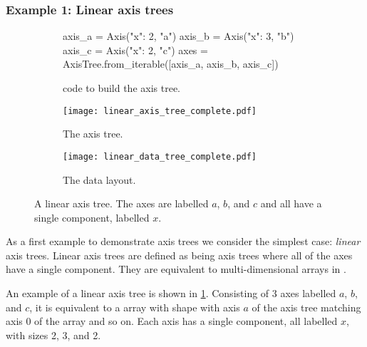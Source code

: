\documentclass[thesis]{subfiles}
\begin{document}
\subsubsection{Example 1: Linear axis trees}

\begin{figure}
  \centering
  \begin{subfigure}{.9\textwidth}
    \begin{pyalg2}
      axis_a = Axis({"x": 2}, "a")
      axis_b = Axis({"x": 3}, "b")
      axis_c = Axis({"x": 2}, "c")
      axes = AxisTree.from_iterable([axis_a, axis_b, axis_c])
    \end{pyalg2}
    \caption{ code to build the axis tree.}
  \end{subfigure}

  \vspace{1em}

  \begin{subfigure}[t]{.3\textwidth}
    \centering
    \texttt{[image: linear\_axis\_tree\_complete.pdf]}
    \caption{The axis tree.}
  \end{subfigure}
  \begin{subfigure}[t]{.3\textwidth}
    \centering
    \texttt{[image: linear\_data\_tree\_complete.pdf]}
    \caption{The data layout.}
  \end{subfigure}
  \caption{
    A linear axis tree.
    The axes are labelled $a$, $b$, and $c$ and all have a single component, labelled $x$.
  }
  \label{fig:linear_axis_tree}
\end{figure}

As a first example to demonstrate axis trees we consider the simplest case: \emph{linear} axis trees.
Linear axis trees are defined as being axis trees where all of the axes have a single component.
They are equivalent to multi-dimensional arrays in \numpy{}.

An example of a linear axis tree is shown in \cref{fig:linear_axis_tree}.
Consisting of 3 axes labelled $a$, $b$, and $c$, it is equivalent to a \numpy{} array with shape  with axis $a$ of the axis tree matching axis 0 of the \numpy{} array and so on.
Each axis has a single component, all labelled $x$, with sizes 2, 3, and 2.
\end{document}
